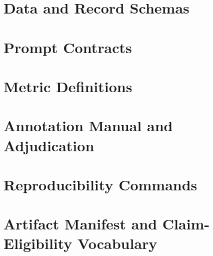 \documentclass[twoside,msc,irfonts]{./tex/tehran-thesis}
\begin{document}
\pagestyle{empty}
\begin{latin}
\small
\onehalfspacing


\end{latin}
\pagestyle{fancy}

\appendix
\renewcommand{\thechapter}{\Alph{chapter}}
\begin{latin}
\chapter{Data and Record Schemas}

\chapter{Prompt Contracts}

\chapter{Metric Definitions}

\chapter{Annotation Manual and Adjudication}

\chapter{Reproducibility Commands}

\chapter{Artifact Manifest and Claim-Eligibility Vocabulary}

\end{latin}
\chapter{}

\chapter{}


\begin{latin}
\latinabstract
\latinTitlePage
\end{latin}
\label{LastPage}
\end{document}
